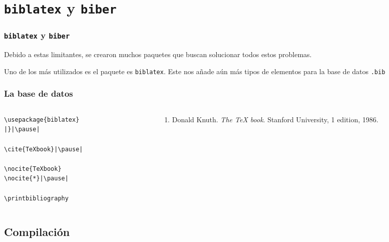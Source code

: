 \documentclass[12pt,aspectratio=169,ignorenonframetext]{ltxbeamer}
\begin{document}
\section{\texttt{biblatex} y \texttt{biber}}

\begin{frame}
\frametitle{\texttt{biblatex} y \texttt{biber}}

Debido a estas limitantes, se crearon muchos paquetes que buscan solucionar todos estos problemas.

\pause

Uno de los más utilizados es el paquete es \texttt{biblatex}. Este nos añade aún más tipos de elementos para la base de datos \texttt{.bib}
\end{frame}





\begin{frame}[fragile]
\frametitle{La base de datos}

\begin{columns}
    \begin{column}{0.5\textwidth}
        \begin{verbatim}
\usepackage{biblatex}
|}|\pause|

\cite{TeXbook}|\pause|

\nocite{TeXbook}
\nocite{*}|\pause|

\printbibliography
        \end{verbatim}
    \end{column}
    \pause
    {\color{gray} \vline}
    \begin{column}{0.5\linewidth}
        \lmr
        \begin{enumerate}
            \item Donald Knuth. \textit{The {\TeX} book}. Stanford University, 1 edition, 1986.
        \end{enumerate}
    \end{column}
\end{columns}
\end{frame}





\subsection{Compilación}
\end{document}
